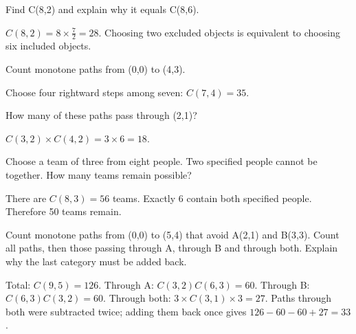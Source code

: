 \documentclass[11pt]{article}
\begin{document}
Find C(8,2) and explain why it equals C(8,6).\par
\(C(8,2) = 8 \times  \frac{7}{2} = 28\). Choosing two excluded objects is equivalent to choosing six included objects.\par
{}
Count monotone paths from (0,0) to (4,3).\par
Choose four rightward steps among seven: \(C(7,4) = 35\).\par
{}
How many of these paths pass through (2,1)?\par
\(C(3,2) \times  C(4,2) = 3 \times  6 = 18\).\par
{}
Choose a team of three from eight people. Two specified people cannot be together. How many teams remain possible?\par
There are \(C(8,3) = 56\) teams. Exactly 6 contain both specified people. Therefore 50 teams remain.\par
{}
Count monotone paths from (0,0) to (5,4) that avoid A(2,1) and B(3,3). Count all paths, then those passing through A, through B and through both. Explain why the last category must be added back.\par
Total: \(C(9,5) = 126\). Through A: \(C(3,2)C(6,3) = 60\). Through B: \(C(6,3)C(3,2) = 60\). Through both: \(3 \times  C(3,1) \times  3 = 27\). Paths through both were subtracted twice; adding them back once gives \(126 - 60 - 60 + 27 = 33\).\par
\end{document}
